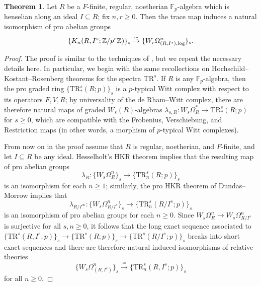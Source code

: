 \documentclass{amsart}
\theoremstyle{definition}
\newtheorem{theorem}[definition]{Theorem}
\newcommand{\bb}{\mathbb}
\newcommand{\To}{\longrightarrow}
\newcommand{\isoto}{\stackrel{\simeq}{\to}}
\newcommand{\sub}[1]{{\mbox{\rm \scriptsize #1}}}
\newcommand{\TR}{\mathrm{TR}}
\begin{document}
\begin{theorem}\label{theorem_pro_GL_relative}
Let $R$ be a $F$-finite, regular, noetherian $\bb F_p$-algebra which is henselian along an ideal $I\subseteq R$; fix $n,r\ge 0$. Then the trace map induces a natural isomorphism of pro abelian groups \[\{K_n(R,I^s;\bb Z/p^r\bb Z)\}_s\isoto \{W_r\Omega^n_{(R,I^s),\sub{log}}\}_s.\]
\end{theorem}
\begin{proof}
The proof is similar to the techniques of \cite[\S5.1]{Morrow-HW}, but we repeat
the necessary details here. In particular, we begin with the same recollections
on Hochschild--Kostant--Rosenberg theorems for the spectra $\TR^s$. If $R$ is
any $\bb F_p$-algebra, then the pro graded ring $\{\TR^s_*(R;p)\}_s$ is a
$p$-typical Witt complex with respect to its operators $F,V,R$; by universality
of the de Rham--Witt complex, there are therefore natural maps of graded $W_s(R)$-algebras \cite[Prop.~1.5.8]{Hesselholt} $\lambda_{s,R}:W_s\Omega_R^*\to \TR_*^s(R;p)$ for $s\ge0$, which are compatible with the Frobenius,  Verschiebung, and Restriction maps (in other words, a morphism of $p$-typical Witt complexes).

From now on in the proof assume that $R$ is regular, noetherian, and $F$-finite, and let $I\subseteq R$ be any ideal. Hesselholt's HKR theorem \cite[Thm.~B]{Hesselholt} implies that the resulting map of pro abelian groups \[\lambda_R:\{W_s\Omega_R^n\}_s\To \{\TR_n^s(R;p)\}_s\] is an isomorphism for each $n\ge 1$; similarly, the pro HKR theorem of Dundas--Morrow \cite[Cor.~4.15]{DundasMorrow} implies that \[\lambda_{R/I^\infty}: \{W_s\Omega_{R/I^s}^n\}_s\To \{\TR_n^s(R/I^s;p)\}_s \tag{pro-HKR}\] is an isomorphism of pro abelian groups for each $n\ge0$. Since $W_s\Omega^n_R\to W_s\Omega^n_{R/I^s}$ is surjective for all $s,n\ge0$, it follows that the long exact sequence associated to $\{\TR^s(R,I^s;p)\}_s\to \{\TR^s(R;p)\}_s\to \{\TR^s(R/I^s;p)\}_s$ breaks into short exact sequences and there are therefore natural induced isomorphisms of relative theories
\[\{W_s\Omega_{(R,I^s)}^n\}_s\isoto \{\TR_n^s(R,I^s;p)\}_s\] for all $n\ge0$.


\end{proof}
\end{document}
